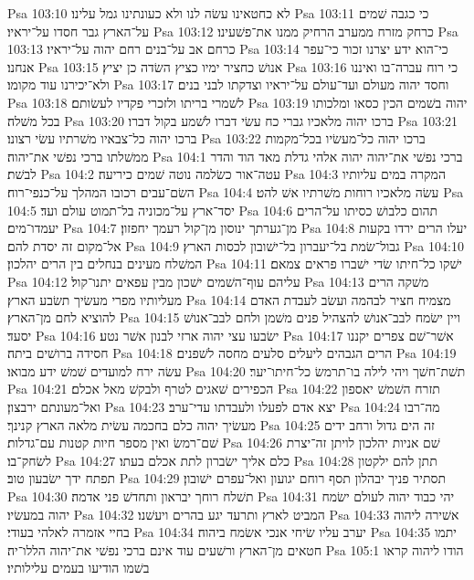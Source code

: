 Psa 103:10  לא כחטאינו עשׂה לנו ולא כעונתינו גמל עלינו׃
Psa 103:11  כי כגבה שׁמים על־הארץ גבר חסדו על־יראיו׃
Psa 103:12  כרחק מזרח ממערב הרחיק ממנו את־פשׁעינו׃
Psa 103:13  כרחם אב על־בנים רחם יהוה על־יראיו׃
Psa 103:14  כי־הוא ידע יצרנו זכור כי־עפר אנחנו׃
Psa 103:15  אנושׁ כחציר ימיו כציץ השׂדה כן יציץ׃
Psa 103:16  כי רוח עברה־בו ואיננו ולא־יכירנו עוד מקומו׃
Psa 103:17  וחסד יהוה מעולם ועד־עולם על־יראיו וצדקתו לבני בנים׃
Psa 103:18  לשׁמרי בריתו ולזכרי פקדיו לעשׂותם׃
Psa 103:19  יהוה בשׁמים הכין כסאו ומלכותו בכל משׁלה׃
Psa 103:20  ברכו יהוה מלאכיו גברי כח עשׂי דברו לשׁמע בקול דברו׃
Psa 103:21  ברכו יהוה כל־צבאיו משׁרתיו עשׂי רצונו׃
Psa 103:22  ברכו יהוה כל־מעשׂיו בכל־מקמות ממשׁלתו ברכי נפשׁי את־יהוה׃
Psa 104:1  ברכי נפשׁי את־יהוה יהוה אלהי גדלת מאד הוד והדר לבשׁת׃
Psa 104:2  עטה־אור כשׂלמה נוטה שׁמים כיריעה׃
Psa 104:3  המקרה במים עליותיו השׂם־עבים רכובו המהלך על־כנפי־רוח׃
Psa 104:4  עשׂה מלאכיו רוחות משׁרתיו אשׁ להט׃
Psa 104:5  יסד־ארץ על־מכוניה בל־תמוט עולם ועד׃
Psa 104:6  תהום כלבושׁ כסיתו על־הרים יעמדו־מים׃
Psa 104:7  מן־גערתך ינוסון מן־קול רעמך יחפזון׃
Psa 104:8  יעלו הרים ירדו בקעות אל־מקום זה יסדת להם׃
Psa 104:9  גבול־שׂמת בל־יעברון בל־ישׁובון לכסות הארץ׃
Psa 104:10  המשׁלח מעינים בנחלים בין הרים יהלכון׃
Psa 104:11  ישׁקו כל־חיתו שׂדי ישׁברו פראים צמאם׃
Psa 104:12  עליהם עוף־השׁמים ישׁכון מבין עפאים יתנו־קול׃
Psa 104:13  משׁקה הרים מעליותיו מפרי מעשׂיך תשׂבע הארץ׃
Psa 104:14  מצמיח חציר לבהמה ועשׂב לעבדת האדם להוציא לחם מן־הארץ׃
Psa 104:15  ויין ישׂמח לבב־אנושׁ להצהיל פנים משׁמן ולחם לבב־אנושׁ יסעד׃
Psa 104:16  ישׂבעו עצי יהוה ארזי לבנון אשׁר נטע׃
Psa 104:17  אשׁר־שׁם צפרים יקננו חסידה ברושׁים ביתה׃
Psa 104:18  הרים הגבהים ליעלים סלעים מחסה לשׁפנים׃
Psa 104:19  עשׂה ירח למועדים שׁמשׁ ידע מבואו׃
Psa 104:20  תשׁת־חשׁך ויהי לילה בו־תרמשׂ כל־חיתו־יער׃
Psa 104:21  הכפירים שׁאגים לטרף ולבקשׁ מאל אכלם׃
Psa 104:22  תזרח השׁמשׁ יאספון ואל־מעונתם ירבצון׃
Psa 104:23  יצא אדם לפעלו ולעבדתו עדי־ערב׃
Psa 104:24  מה־רבו מעשׂיך יהוה כלם בחכמה עשׂית מלאה הארץ קנינך׃
Psa 104:25  זה הים גדול ורחב ידים שׁם־רמשׂ ואין מספר חיות קטנות עם־גדלות׃
Psa 104:26  שׁם אניות יהלכון לויתן זה־יצרת לשׂחק־בו׃
Psa 104:27  כלם אליך ישׂברון לתת אכלם בעתו׃
Psa 104:28  תתן להם ילקטון תפתח ידך ישׂבעון טוב׃
Psa 104:29  תסתיר פניך יבהלון תסף רוחם יגועון ואל־עפרם ישׁובון׃
Psa 104:30  תשׁלח רוחך יבראון ותחדשׁ פני אדמה׃
Psa 104:31  יהי כבוד יהוה לעולם ישׂמח יהוה במעשׂיו׃
Psa 104:32  המביט לארץ ותרעד יגע בהרים ויעשׁנו׃
Psa 104:33  אשׁירה ליהוה בחיי אזמרה לאלהי בעודי׃
Psa 104:34  יערב עליו שׂיחי אנכי אשׂמח ביהוה׃
Psa 104:35  יתמו חטאים מן־הארץ ורשׁעים עוד אינם ברכי נפשׁי את־יהוה הללו־יה׃
Psa 105:1  הודו ליהוה קראו בשׁמו הודיעו בעמים עלילותיו׃
